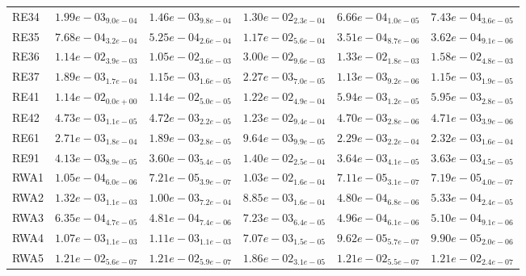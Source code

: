 \documentclass{article}
\begin{document}
\begin{table}
\begin{scriptsize}
\begin{tabular}{llllll}
RE34 & $  1.99e-03_{ 9.0e-04}$ & $  1.46e-03_{ 9.8e-04}$ & $  1.30e-02_{ 2.3e-04}$ & \cellcolor{gray95}$  6.66e-04_{ 1.0e-05}$ & \cellcolor{gray25}$  7.43e-04_{ 3.6e-05}$ \\
RE35 & $  7.68e-04_{ 3.2e-04}$ & $  5.25e-04_{ 2.6e-04}$ & $  1.17e-02_{ 5.6e-04}$ & \cellcolor{gray95}$  3.51e-04_{ 8.7e-06}$ & \cellcolor{gray25}$  3.62e-04_{ 9.1e-06}$ \\
RE36 & \cellcolor{gray25}$  1.14e-02_{ 3.9e-03}$ & \cellcolor{gray95}$  1.05e-02_{ 3.6e-03}$ & $  3.00e-02_{ 9.6e-03}$ & $  1.33e-02_{ 1.8e-03}$ & $  1.58e-02_{ 4.8e-03}$ \\
RE37 & $  1.89e-03_{ 1.7e-04}$ & $  1.15e-03_{ 1.6e-05}$ & $  2.27e-03_{ 7.0e-05}$ & \cellcolor{gray95}$  1.13e-03_{ 9.2e-06}$ & \cellcolor{gray25}$  1.15e-03_{ 1.9e-05}$ \\
RE41 & $  1.14e-02_{ 0.0e+00}$ & $  1.14e-02_{ 5.0e-05}$ & $  1.22e-02_{ 4.9e-04}$ & \cellcolor{gray95}$  5.94e-03_{ 1.2e-05}$ & \cellcolor{gray25}$  5.95e-03_{ 2.8e-05}$ \\
RE42 & $  4.73e-03_{ 1.1e-05}$ & $  4.72e-03_{ 2.2e-05}$ & $  1.23e-02_{ 9.4e-04}$ & \cellcolor{gray95}$  4.70e-03_{ 2.8e-06}$ & \cellcolor{gray25}$  4.71e-03_{ 3.9e-06}$ \\
RE61 & $  2.71e-03_{ 1.8e-04}$ & \cellcolor{gray95}$  1.89e-03_{ 2.8e-05}$ & $  9.64e-03_{ 9.9e-05}$ & \cellcolor{gray25}$  2.29e-03_{ 2.2e-04}$ & $  2.32e-03_{ 1.6e-04}$ \\
RE91 & $  4.13e-03_{ 8.9e-05}$ & \cellcolor{gray95}$  3.60e-03_{ 5.4e-05}$ & $  1.40e-02_{ 2.5e-04}$ & $  3.64e-03_{ 4.1e-05}$ & \cellcolor{gray25}$  3.63e-03_{ 4.5e-05}$ \\
RWA1 & $  1.05e-04_{ 6.0e-06}$ & $  7.21e-05_{ 3.9e-07}$ & $  1.03e-02_{ 1.6e-04}$ & \cellcolor{gray95}$  7.11e-05_{ 3.1e-07}$ & \cellcolor{gray25}$  7.19e-05_{ 4.0e-07}$ \\
RWA2 & $  1.32e-03_{ 1.1e-03}$ & $  1.00e-03_{ 7.2e-04}$ & $  8.85e-03_{ 1.6e-04}$ & \cellcolor{gray95}$  4.80e-04_{ 6.8e-06}$ & \cellcolor{gray25}$  5.33e-04_{ 2.4e-05}$ \\
RWA3 & $  6.35e-04_{ 4.7e-05}$ & \cellcolor{gray95}$  4.81e-04_{ 7.4e-06}$ & $  7.23e-03_{ 6.4e-05}$ & \cellcolor{gray25}$  4.96e-04_{ 6.1e-06}$ & $  5.10e-04_{ 9.1e-06}$ \\
RWA4 & $  1.07e-03_{ 1.1e-03}$ & $  1.11e-03_{ 1.1e-03}$ & $  7.07e-03_{ 1.5e-05}$ & \cellcolor{gray95}$  9.62e-05_{ 5.7e-07}$ & \cellcolor{gray25}$  9.90e-05_{ 2.0e-06}$ \\
RWA5 & $  1.21e-02_{ 5.6e-07}$ & \cellcolor{gray25}$  1.21e-02_{ 5.9e-07}$ & $  1.86e-02_{ 3.1e-05}$ & $  1.21e-02_{ 5.5e-07}$ & \cellcolor{gray95}$  1.21e-02_{ 2.4e-07}$ \\

\end{tabular}
\end{scriptsize}
\end{table}
\end{document}
